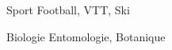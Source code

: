 

\begin{cvpairs}

  
\cvpair
    {Sport} %
    {Football, VTT, Ski} %


\cvpair
    {Biologie} %
    {Entomologie, Botanique} %

\end{cvpairs}